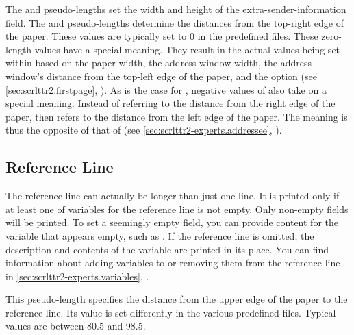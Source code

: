 \begin{Declaration}
\end{Declaration}
The  and
 pseudo-lengths set the
width and height of the extra-sender-information field. The 
and  pseudo-lengths determine the distances from the
top-right edge of the paper. These values are typically set to 0 in
the predefined  files. These zero-length values
have a special meaning. They result in the actual values being set within
 based on the paper width, the address-window
width, the address window's distance from the top-left edge of the paper, and
the  option (see
\autoref{sec:scrlttr2.firstpage}, ). As
is the case for , negative values of 
also take on a special meaning. Instead of referring to the distance from the
right edge of the paper,  then refers to the distance from
the left edge of the paper. The meaning is thus the opposite of that of
 (see \autoref{sec:scrlttr2-experts.addressee},
).%
\EndIndexGroup
%
\EndIndexGroup


\subsection{Reference Line}
%
\BeginIndexGroup
{}

The reference line can actually be longer than just one line. It is printed
only if at least one of variables for the reference line is not empty. Only
non-empty fields will be printed. To set a seemingly empty
field, you can provide content for the variable that appears empty, such as
\Parameter{}. If the reference line is omitted, the description
and contents of the  variable are printed in
its place. You can find information about adding variables to or removing them
from the reference line in \autoref{sec:scrlttr2-experts.variables},
.


\begin{Declaration}
\end{Declaration}
This pseudo-length specifies the distance from the upper edge of the paper to
the reference line. Its value is set differently in the various predefined
 files.
Typical values are between 80.5 and 98.5.%
\EndIndexGroup


